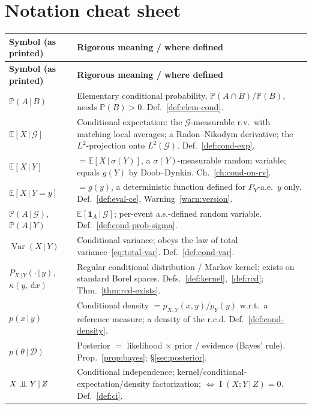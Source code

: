\documentclass[11pt,oneside]{report}
\theoremstyle{plain}
\theoremstyle{definition}
\theoremstyle{remark}
\newcommand{\Prob}{\mathbb{P}}
\newcommand{\E}{\mathbb{E}}
\newcommand{\one}{\mathbf{1}}                 %
\newcommand{\dd}{\,\mathrm{d}}
\newcommand{\Gcal}{\mathcal{G}}
\newcommand{\Dcal}{\mathcal{D}}
\newcommand{\given}{\,\vert\,}
\newcommand{\indep}{\mathrel{\perp\mkern-10mu\perp}}
\DeclareMathOperator{\Var}{Var}
\DeclareMathOperator{\MI}{I}         %
\numberwithin{equation}{chapter}
\begin{document}
\chapter{Notation cheat sheet}\label{app:cheatsheet}

\renewcommand{\arraystretch}{1.45}
\begin{longtable}{@{} p{} p{} @{}}
\toprule
\textbf{Symbol (as printed)} & \textbf{Rigorous meaning / where defined}\\
\midrule
\endfirsthead
\toprule
\textbf{Symbol (as printed)} & \textbf{Rigorous meaning / where defined}\\
\midrule
\endhead
\bottomrule
\endfoot
$\Prob(A\given B)$ &
  Elementary conditional probability, $\Prob(A\cap B)/\Prob(B)$, needs
  $\Prob(B)>0$. Def.~\ref{def:elem-cond}.\\
$\E[X\given\Gcal]$ &
  Conditional expectation: the $\Gcal$-measurable r.v.\ with matching local
  averages; a Radon--Nikodym derivative; the $L^2$-projection onto
  $L^2(\Gcal)$. Def.~\ref{def:cond-exp}.\\
$\E[X\given Y]$ &
  $=\E[X\given\sigma(Y)]$, a $\sigma(Y)$-measurable random variable; equals
  $g(Y)$ by Doob--Dynkin. Ch.~\ref{ch:cond-on-rv}.\\
$\E[X\given Y=y]$ &
  $=g(y)$, a deterministic function defined for $P_Y$-a.e.\ $y$ only.
  Def.~\ref{def:eval-ce}, Warning~\ref{warn:version}.\\
$\Prob(A\given\Gcal)$, $\Prob(A\given Y)$ &
  $\E[\one_A\given\Gcal]$; per-event a.s.-defined random variable.
  Def.~\ref{def:cond-prob-sigma}.\\
$\Var(X\given Y)$ &
  Conditional variance; obeys the law of total variance~\eqref{eq:total-var}.
  Def.~\ref{def:cond-var}.\\
$P_{X\given Y}(\cdot\given y)$, $\kappa(y,\dd x)$ &
  Regular conditional distribution / Markov kernel; exists on standard Borel
  spaces. Defs.~\ref{def:kernel},~\ref{def:rcd}; Thm.~\ref{thm:rcd-exists}.\\
$p(x\given y)$ &
  Conditional density $=p_{X,Y}(x,y)/p_Y(y)$ w.r.t.\ a reference measure;
  a density of the r.c.d. Def.~\ref{def:cond-density}.\\
$p(\theta\given\Dcal)$ &
  Posterior $=$ likelihood $\times$ prior $/$ evidence (Bayes' rule).
  Prop.~\ref{prop:bayes}; \S\ref{sec:posterior}.\\
$X\indep Y\given Z$ &
  Conditional independence; kernel/conditional-expectation/density
  factorization; $\iff \MI(X;Y\given Z)=0$. Def.~\ref{def:ci}.\\

\end{longtable}
\end{document}
